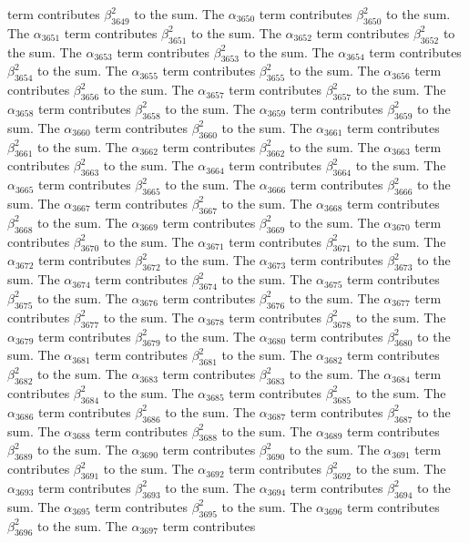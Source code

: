 \begin{lemma}
term contributes $\beta_{3649}^{2}$ to the sum. The $\alpha_{3650}$ term contributes $\beta_{3650}^{2}$ to the sum. The $\alpha_{3651}$ term contributes $\beta_{3651}^{2}$ to the sum. The $\alpha_{3652}$ term contributes $\beta_{3652}^{2}$ to the sum. The $\alpha_{3653}$ term contributes $\beta_{3653}^{2}$ to the sum. The $\alpha_{3654}$ term contributes $\beta_{3654}^{2}$ to the sum. The $\alpha_{3655}$ term contributes $\beta_{3655}^{2}$ to the sum. The $\alpha_{3656}$ term contributes $\beta_{3656}^{2}$ to the sum. The $\alpha_{3657}$ term contributes $\beta_{3657}^{2}$ to the sum. The $\alpha_{3658}$ term contributes $\beta_{3658}^{2}$ to the sum. The $\alpha_{3659}$ term contributes $\beta_{3659}^{2}$ to the sum. The $\alpha_{3660}$ term contributes $\beta_{3660}^{2}$ to the sum. The $\alpha_{3661}$ term contributes $\beta_{3661}^{2}$ to the sum. The $\alpha_{3662}$ term contributes $\beta_{3662}^{2}$ to the sum. The $\alpha_{3663}$ term contributes $\beta_{3663}^{2}$ to the sum. The $\alpha_{3664}$ term contributes $\beta_{3664}^{2}$ to the sum. The $\alpha_{3665}$ term contributes $\beta_{3665}^{2}$ to the sum. The $\alpha_{3666}$ term contributes $\beta_{3666}^{2}$ to the sum. The $\alpha_{3667}$ term contributes $\beta_{3667}^{2}$ to the sum. The $\alpha_{3668}$ term contributes $\beta_{3668}^{2}$ to the sum. The $\alpha_{3669}$ term contributes $\beta_{3669}^{2}$ to the sum. The $\alpha_{3670}$ term contributes $\beta_{3670}^{2}$ to the sum. The $\alpha_{3671}$ term contributes $\beta_{3671}^{2}$ to the sum. The $\alpha_{3672}$ term contributes $\beta_{3672}^{2}$ to the sum. The $\alpha_{3673}$ term contributes $\beta_{3673}^{2}$ to the sum. The $\alpha_{3674}$ term contributes $\beta_{3674}^{2}$ to the sum. The $\alpha_{3675}$ term contributes $\beta_{3675}^{2}$ to the sum. The $\alpha_{3676}$ term contributes $\beta_{3676}^{2}$ to the sum. The $\alpha_{3677}$ term contributes $\beta_{3677}^{2}$ to the sum. The $\alpha_{3678}$ term contributes $\beta_{3678}^{2}$ to the sum. The $\alpha_{3679}$ term contributes $\beta_{3679}^{2}$ to the sum. The $\alpha_{3680}$ term contributes $\beta_{3680}^{2}$ to the sum. The $\alpha_{3681}$ term contributes $\beta_{3681}^{2}$ to the sum. The $\alpha_{3682}$ term contributes $\beta_{3682}^{2}$ to the sum. The $\alpha_{3683}$ term contributes $\beta_{3683}^{2}$ to the sum. The $\alpha_{3684}$ term contributes $\beta_{3684}^{2}$ to the sum. The $\alpha_{3685}$ term contributes $\beta_{3685}^{2}$ to the sum. The $\alpha_{3686}$ term contributes $\beta_{3686}^{2}$ to the sum. The $\alpha_{3687}$ term contributes $\beta_{3687}^{2}$ to the sum. The $\alpha_{3688}$ term contributes $\beta_{3688}^{2}$ to the sum. The $\alpha_{3689}$ term contributes $\beta_{3689}^{2}$ to the sum. The $\alpha_{3690}$ term contributes $\beta_{3690}^{2}$ to the sum. The $\alpha_{3691}$ term contributes $\beta_{3691}^{2}$ to the sum. The $\alpha_{3692}$ term contributes $\beta_{3692}^{2}$ to the sum. The $\alpha_{3693}$ term contributes $\beta_{3693}^{2}$ to the sum. The $\alpha_{3694}$ term contributes $\beta_{3694}^{2}$ to the sum. The $\alpha_{3695}$ term contributes $\beta_{3695}^{2}$ to the sum. The $\alpha_{3696}$ term contributes $\beta_{3696}^{2}$ to the sum. The $\alpha_{3697}$ term contributes 
\end{lemma}
